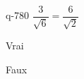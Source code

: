 \begin{truefalse}{q-780}
$\dfrac{3}{\sqrt{6}}=\dfrac{6}{\sqrt{2}}$
\item Vrai
\item* Faux
\end{truefalse}

